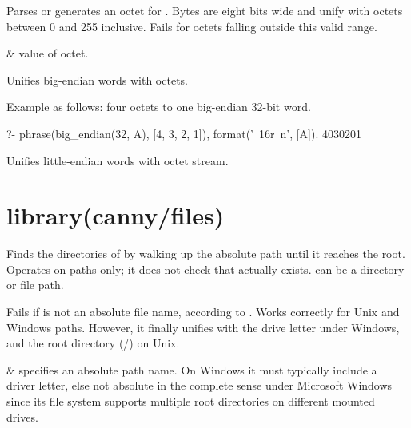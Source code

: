 \begin{description}
Parses or generates an octet for . Bytes are eight bits wide and
unify with octets between 0 and 255 inclusive. Fails for octets
falling outside this valid range.

\begin{arguments}
 & value of octet. \\
\end{arguments}

Unifies big-endian words with octets.

Example as follows: four octets to one big-endian 32-bit word.

\begin{code}
?- phrase(big_endian(32, A), [4, 3, 2, 1]),
   format('~16r~n', [A]).
4030201
\end{code}

Unifies little-endian words with octet stream.
\end{description}

\chapter{library(canny/files)}\label{sec:files}

\begin{description}
Finds the directories of  by walking up the absolute path
until it reaches the root. Operates on paths only; it does not check
that  actually exists.  can be a directory or file
path.

Fails if  is not an absolute file name, according to
. Works correctly for Unix and Windows paths.
However, it finally unifies with the drive letter under Windows, and
the root directory (/) on Unix.

\begin{arguments}
 & specifies an absolute path name. On Windows it must
typically include a driver letter, else not absolute in the complete
sense under Microsoft Windows since its file system supports
multiple root directories on different mounted drives. \\
\end{arguments}
\end{description}

